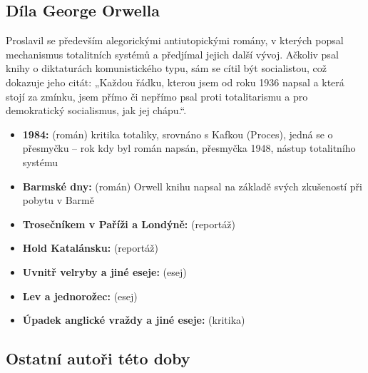 \documentclass{article}
\newcommand{\point}[1]{\noindent \textbf{#1:}}
\begin{document}
\subsection{Díla George Orwella}
Proslavil se především alegorickými antiutopickými romány, v kterých popsal mechanismus totalitních systémů a 
předjímal jejich další vývoj. Ačkoliv psal knihy o diktaturách komunistického typu, sám se cítil být 
socialistou, což dokazuje jeho citát: „Každou řádku, kterou jsem od roku 1936 napsal a která stojí za zmínku, 
jsem přímo či nepřímo psal proti totalitarismu a pro demokratický socialismus, jak jej chápu.“. 

\begin{itemize}
    \item \point{1984} (román) kritika totaliky, srovnáno s Kafkou (Proces), jedná se o přesmyčku – rok kdy 
    byl román napsán, přesmyčka 1948, nástup totalitního systému
    
    \item \point{Barmské dny} (román) Orwell knihu napsal na základě svých zkušeností při pobytu v Barmě
    \item \point{Trosečníkem v Paříži a Londýně} (reportáž)
    \item \point{Hold Katalánsku} (reportáž)
    \item \point{Uvnitř velryby a jiné eseje} (esej)
	\item \point{Lev a jednorožec} (esej)
	\item \point{Úpadek anglické vraždy a jiné eseje} (kritika)

\end{itemize}

\subsection{Ostatní autoři této doby}
\end{document}
